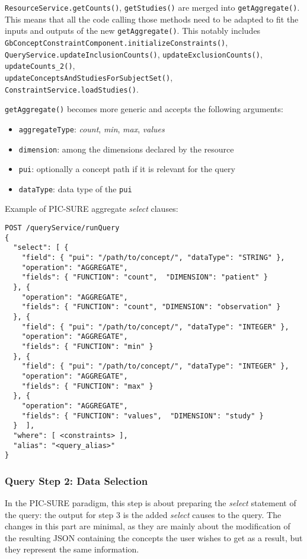 \verb|ResourceService.getCounts()|, \verb|getStudies()| are merged into \verb|getAggregate()|.
This means that all the code calling those methods need to be adapted to fit the inputs and outputs of the new \verb|getAggregate()|.
This notably includes \verb|GbConceptConstraintComponent.initializeConstraints()|, \verb|QueryService.updateInclusionCounts()|, \verb|updateExclusionCounts()|, \verb|updateCounts_2()|, \\
\verb|updateConceptsAndStudiesForSubjectSet()|, \verb|ConstraintService.loadStudies()|.

\verb|getAggregate()| becomes more generic and accepts the following arguments:
\begin{itemize}
    \item \verb|aggregateType|: \emph{count}, \emph{min}, \emph{max}, \emph{values}
    \item \verb|dimension|: among the dimensions declared by the resource
    \item \verb|pui|: optionally a concept path if it is relevant for the query
    \item \verb|dataType|: data type of the \verb|pui|
\end{itemize}

Example of PIC-SURE aggregate \emph{select} clauses:
\begin{verbatim}
POST /queryService/runQuery
{
  "select": [ {
    "field": { "pui": "/path/to/concept/", "dataType": "STRING" },
    "operation": "AGGREGATE",
    "fields": { "FUNCTION": "count",  "DIMENSION": "patient" }
  }, {
    "operation": "AGGREGATE",
    "fields": { "FUNCTION": "count", "DIMENSION": "observation" }
  }, {
    "field": { "pui": "/path/to/concept/", "dataType": "INTEGER" },
    "operation": "AGGREGATE",
    "fields": { "FUNCTION": "min" }
  }, {
    "field": { "pui": "/path/to/concept/", "dataType": "INTEGER" },
    "operation": "AGGREGATE",
    "fields": { "FUNCTION": "max" }
  }, {
    "operation": "AGGREGATE",
    "fields": { "FUNCTION": "values",  "DIMENSION": "study" }
  }  ],
  "where": [ <constraints> ],
  "alias": "<query_alias>"
}
\end{verbatim}


\subsubsection{Query Step 2: Data Selection}

In the PIC-SURE paradigm, this step is about preparing the \emph{select} statement of the query: the output for step 3 is the added \emph{select} causes to the query.
The changes in this part are minimal, as they are mainly about the modification of the resulting JSON containing the concepts the user wishes to get as a result, but they represent the same information.


